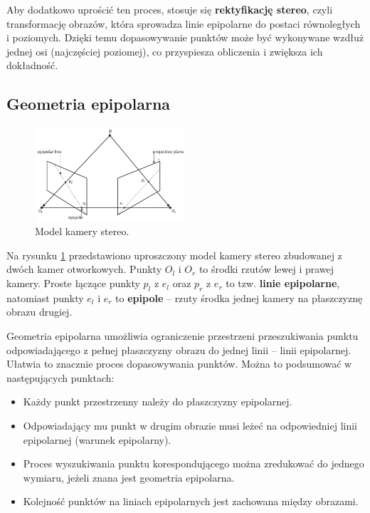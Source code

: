 \documentclass[magisterska]{pracadypl}
\begin{document}
Aby dodatkowo uprościć ten proces, stosuje się \textbf{rektyfikację stereo}, czyli transformację obrazów, która sprowadza linie epipolarne do postaci równoległych i poziomych. Dzięki temu dopasowywanie punktów może być wykonywane wzdłuż jednej osi (najczęściej poziomej), co przyspiesza obliczenia i zwiększa ich dokładność.

\subsection{Geometria epipolarna}

\begin{figure}[H]
    \centering
    \includegraphics[width=0.5\textwidth]{images/epipolar.png}
    \captionsetup{font=footnotesize}
    \caption[Model kamery stereo. Learning OpenCV 3, O'Reilly, Str. 709]{Model kamery stereo.}
    \label{fig:rpi}
\end{figure}

Na rysunku \ref{fig:rpi} przedstawiono uproszczony model kamery stereo zbudowanej z dwóch kamer otworkowych. Punkty $O_l$ i $O_r$ to środki rzutów lewej i prawej kamery. Proste łączące punkty $p_l$ z $e_l$ oraz $p_r$ z $e_r$ to tzw. \textbf{linie epipolarne}, natomiast punkty $e_l$ i $e_r$ to \textbf{epipole} – rzuty środka jednej kamery na płaszczyznę obrazu drugiej.

Geometria epipolarna umożliwia ograniczenie przestrzeni przeszukiwania punktu odpowiadającego z pełnej płaszczyzny obrazu do jednej linii – linii epipolarnej. Ułatwia to znacznie proces dopasowywania punktów. Można to podsumować w następujących punktach:

\begin{itemize}
    \item Każdy punkt przestrzenny należy do płaszczyzny epipolarnej.
    \item Odpowiadający mu punkt w drugim obrazie musi leżeć na odpowiedniej linii epipolarnej (warunek epipolarny).
    \item Proces wyszukiwania punktu korespondującego można zredukować do jednego wymiaru, jeżeli znana jest geometria epipolarna.
    \item Kolejność punktów na liniach epipolarnych jest zachowana między obrazami.
\end{itemize}
\end{document}
